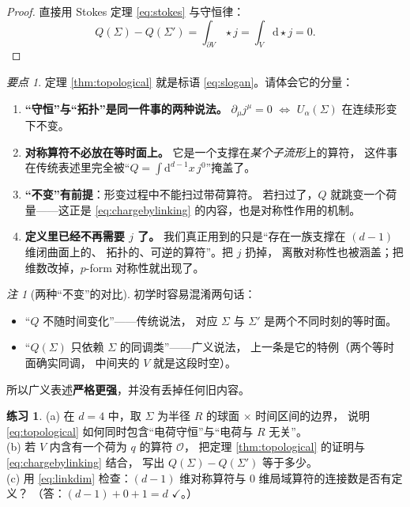 \documentclass[UTF8,a4paper,11pt]{ctexart}
\theoremstyle{plain}
\theoremstyle{definition}
\newtheorem{exercise}{练习}[section]
\theoremstyle{remark}
\newtheorem{remark}{注}[section]
\newtheorem{keypoint}{要点}[section]
\newcommand{\ext}{\mathrm{d}}          %
\newcommand{\hs}{\star}                %
\newcommand{\Op}{\mathcal{O}}
\newcommand{\Ssurf}{\Sigma}
\newcommand{\Uop}{U}
\begin{document}
\begin{proof}
直接用 Stokes 定理 \eqref{eq:stokes} 与守恒律：
\begin{equation}
  Q(\Ssurf)-Q(\Ssurf')
  =\int_{\partial V}\hs j
  =\int_V \ext\hs j
  =0 .
\end{equation}
\end{proof}

\begin{keypoint}
\label{kp:pivot}
定理 \ref{thm:topological} 就是标语 \eqref{eq:slogan}。请体会它的分量：
\begin{enumerate}[label=(\arabic*)]
  \item \textbf{“守恒”与“拓扑”是同一件事的两种说法。}
        $\partial_\mu j^\mu=0$ $\Leftrightarrow$
        $\Uop_\alpha(\Ssurf)$ 在连续形变下不变。
  \item \textbf{对称算符不必放在等时面上。}
        它是一个支撑在\emph{某个子流形}上的算符，
        这件事在传统表述里完全被“$Q=\int \ext^{d-1}x\,j^0$”掩盖了。
  \item \textbf{“不变”有前提}：形变过程中不能扫过带荷算符。
        若扫过了，$Q$ 就跳变一个荷量——这正是
        \eqref{eq:chargebylinking} 的内容，也是对称性作用的机制。
  \item \textbf{定义里已经不再需要 $j$ 了。}
        我们真正用到的只是“存在一族支撑在 $(d-1)$ 维闭曲面上的、
        拓扑的、可逆的算符”。把 $j$ 扔掉，
        离散对称性也被涵盖；把维数改掉，$p$-form 对称性就出现了。
\end{enumerate}
\end{keypoint}

\begin{remark}[两种“不变”的对比]
初学时容易混淆两句话：
\begin{itemize}
  \item “$Q$ 不随时间变化”——传统说法，
        对应 $\Ssurf$ 与 $\Ssurf'$ 是两个不同时刻的等时面。
  \item “$Q(\Ssurf)$ 只依赖 $\Ssurf$ 的同调类”——广义说法，
        上一条是它的特例（两个等时面确实同调，
        中间夹的 $V$ 就是这段时空）。
\end{itemize}
所以广义表述\textbf{严格更强}，并没有丢掉任何旧内容。
\end{remark}

\begin{exercise}
\label{ex:pivot}
(a) 在 $d=4$ 中，取 $\Ssurf$ 为半径 $R$ 的球面 $\times$ 时间区间的边界，
说明 \eqref{eq:topological} 如何同时包含“电荷守恒”与“电荷与 $R$ 无关”。\\
(b) 若 $V$ 内含有一个荷为 $q$ 的算符 $\Op$，
把定理 \ref{thm:topological} 的证明与 \eqref{eq:chargebylinking} 结合，
写出 $Q(\Ssurf)-Q(\Ssurf')$ 等于多少。\\
(c) 用 \eqref{eq:linkdim} 检查：$(d-1)$ 维对称算符与
$0$ 维局域算符的连接数是否有定义？
（答：$(d-1)+0+1=d$ $\checkmark$。）
\end{exercise}
\end{document}
